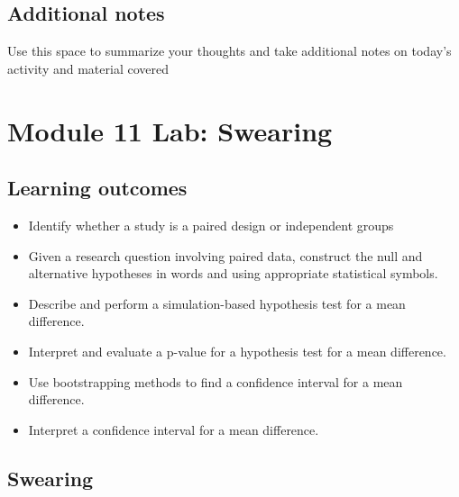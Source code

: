 \documentclass[
]{report}
\begin{document}
\subsection{Additional notes}\label{additional-notes-22}

Use this space to summarize your thoughts and take additional notes on today's activity and material covered

\newpage

\section{Module 11 Lab: Swearing}\label{module-11-lab-swearing}


\subsection{Learning outcomes}\label{learning-outcomes-26}

\begin{itemize}
\item
  Identify whether a study is a paired design or independent groups
\item
  Given a research question involving paired data, construct the null and alternative hypotheses
  in words and using appropriate statistical symbols.
\item
  Describe and perform a simulation-based hypothesis test for a mean difference.
\item
  Interpret and evaluate a p-value for a hypothesis test for a mean difference.
\item
  Use bootstrapping methods to find a confidence interval for a mean difference.
\item
  Interpret a confidence interval for a mean difference.
\end{itemize}

\subsection{Swearing}\label{swearing}
\end{document}
